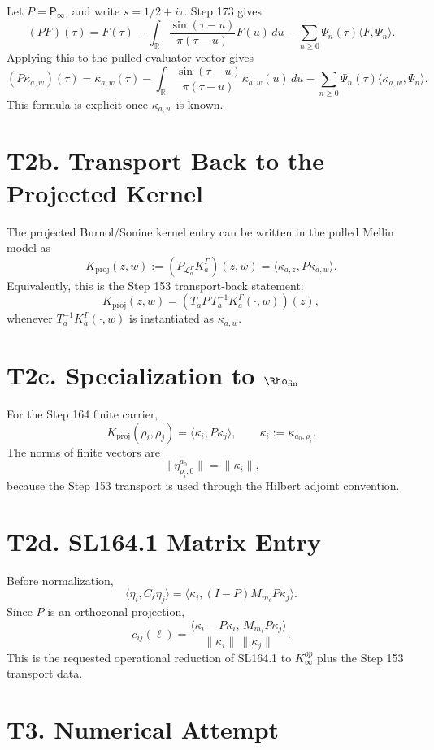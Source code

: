 \documentclass[11pt]{article}
\newcommand{\Psym}{\mathsf P_\infty}
\newcommand{\Cell}{C_\ell}
\begin{document}
Let \(P=\Psym\), and write \(s=1/2+i\tau\).  Step 173 gives
\[
(P F)(\tau)
=
F(\tau)
-\int_{\mathbb R}
\frac{\sin(\tau-u)}{\pi(\tau-u)}F(u)\,du
-\sum_{n\ge0}\Psi_n(\tau)\langle F,\Psi_n\rangle.
\]
Applying this to the pulled evaluator vector gives
\[
\boxed{
(P\kappa_{a,w})(\tau)
=
\kappa_{a,w}(\tau)
-\int_{\mathbb R}
\frac{\sin(\tau-u)}{\pi(\tau-u)}
\kappa_{a,w}(u)\,du
-\sum_{n\ge0}\Psi_n(\tau)
\langle \kappa_{a,w},\Psi_n\rangle.
}
\]
This formula is explicit once \(\kappa_{a,w}\) is known.

\section{T2b. Transport Back to the Projected Kernel}

The projected Burnol/Sonine kernel entry can be written in the pulled Mellin
model as
\[
\boxed{
K_{\mathrm{proj}}(z,w)
:=
(P_{\mathcal L_a^\Gamma}K_a^\Gamma)(z,w)
=
\langle \kappa_{a,z},P\kappa_{a,w}\rangle.
}
\]
Equivalently, this is the Step 153 transport-back statement:
\[
K_{\mathrm{proj}}(z,w)
=
\left(T_aP\,T_a^{-1}K_a^\Gamma(\cdot,w)\right)(z),
\]
whenever \(T_a^{-1}K_a^\Gamma(\cdot,w)\) is instantiated as
\(\kappa_{a,w}\).

\section{T2c. Specialization to \(\Rho_{\mathrm{fin}}\)}

For the Step 164 finite carrier,
\[
\boxed{
K_{\mathrm{proj}}(\rho_i,\rho_j)
=
\langle \kappa_i,P\kappa_j\rangle,
\qquad
\kappa_i:=\kappa_{a_0,\rho_i}.
}
\]
The norms of finite vectors are
\[
\|\eta^{a_0}_{\rho_i,0}\|=\|\kappa_i\|,
\]
because the Step 153 transport is used through the Hilbert adjoint convention.

\section{T2d. SL164.1 Matrix Entry}

Before normalization,
\[
\langle \eta_i,\Cell\eta_j\rangle
=
\langle \kappa_i,(I-P)M_{m_\ell}P\kappa_j\rangle.
\]
Since \(P\) is an orthogonal projection,
\[
\boxed{
c_{ij}(\ell)
=
\frac{
\langle \kappa_i-P\kappa_i,\,
M_{m_\ell}P\kappa_j\rangle}
{\|\kappa_i\|\,\|\kappa_j\|}.
}
\]
This is the requested operational reduction of SL164.1 to \(K_\infty^{op}\)
plus the Step 153 transport data.

\section{T3. Numerical Attempt}
\end{document}
